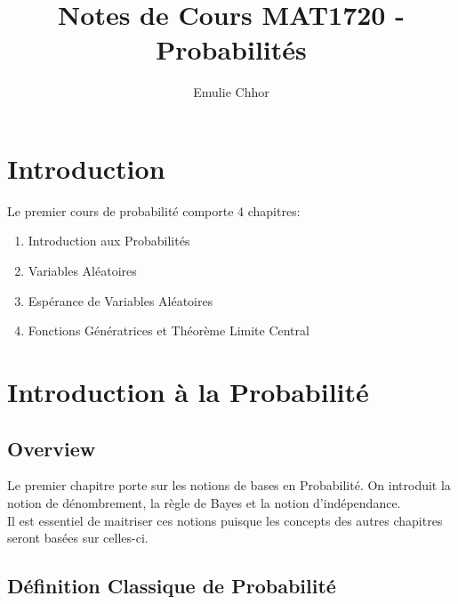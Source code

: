 \documentclass{article}
\begin{document}
\title{Notes de Cours MAT1720 - Probabilités}
\author{Emulie Chhor}
\maketitle

\section*{Introduction}

Le premier cours de probabilité comporte 4 chapitres:

\begin{enumerate}
    \item Introduction aux Probabilités
    \item Variables Aléatoires
    \item Espérance de Variables Aléatoires
    \item Fonctions Génératrices et Théorème Limite Central
\end{enumerate}

\newtheorem{definition}{Definition}[subsection]
\newtheorem{theorem}{Theorem}[subsection]
\newtheorem{corollary}{Corollary}[subsection]
\newtheorem{lemma}[theorem]{Lemma}
\newtheorem{proposition}{Proposition}[section]
\newtheorem{axiom}{Axiome}
\newtheorem{property}{Propriété}[subsection]
\newtheorem*{remark}{Remarque}
\newtheorem*{problem}{Problème}
\newtheorem*{intuition}{Intuition}

\section{Introduction à la Probabilité}

\subsection*{Overview}

Le premier chapitre porte sur les notions de bases en Probabilité.
On introduit la notion de dénombrement, la règle de Bayes et la
notion d'indépendance.\\

Il est essentiel de maitriser ces notions puisque les concepts des
autres chapitres seront basées sur celles-ci.

\subsection{Définition Classique de Probabilité}
\end{document}
